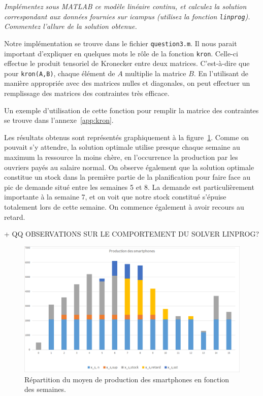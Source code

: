 \question %
\emph{Implémentez sous MATLAB ce modèle linéaire continu,
et calculez la solution correspondant aux données fournies sur icampus
(utilisez la fonction \texttt{linprog}).
Commentez l'allure de la solution obtenue.}

Notre implémentation se trouve dans le fichier \texttt{question3.m}.
Il nous parait important d'expliquer en quelques mots le r\^ole
de la fonction \texttt{kron}.
Celle-ci effectue le produit tensoriel de Kronecker entre deux matrices.
C'est-à-dire que pour \texttt{kron(A,B)},
chaque élément de $A$ multiplie la matrice $B$.
En l'utilisant de manière appropriée avec des matrices nulles et diagonales,
on peut effectuer un remplissage des matrices des contraintes très efficace.

Un exemple d'utilisation de cette fonction pour remplir la matrice
des contraintes se trouve dans l'annexe~\ref{app:kron}.

Les résultats obtenus sont représentés graphiquement
à la figure~\ref{fig:grapheProduction}.
Comme on pouvait s'y attendre, la solution optimale utilise presque chaque
semaine au maximum la ressource la moins chère,
en l'occurrence la production par les ouvriers payés au salaire normal.
On observe également que la solution optimale constitue un stock dans la première partie de la planification pour faire face au pic de demande
situé entre les semaines 5 et 8.
La demande est particulièrement importante à la semaine 7,
et on voit que notre stock constitué s'épuise totalement lors de cette semaine.
On commence également à avoir recours au retard.

+ QQ OBSERVATIONS SUR LE COMPORTEMENT DU SOLVER LINPROG?

\begin{figure}[H]
  \begin{center}
    \includegraphics[scale = 0.8]{img/grapheProduction.png}
	  \caption{Répartition du moyen de production des smartphones en fonction des semaines.}
	  \label{fig:grapheProduction}
  \end{center}
\end{figure}

